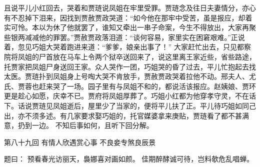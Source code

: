 \documentclass[12pt,oneside]{book}
\begin{document}
且说平儿小红回去，哭着和贾琏说凤姐在牢里受罪。贾琏念及往日夫妻情分，亦心有不忍掉下泪来，因找到贾赦贾政哭道：“如今他在那牢中受苦，虽是报应，却着实可怜。本以为休了他就罢了，谁知又牵出一串子命案，今生不得放出，大家再聚些银两减减他的罪罢。”贾赦贾政落泪道：“谈何容易，家里实在困窘艰难。”正说着，忽见巧姐大哭着跑进来道：“爹爹，娘亲出事了！”
大家赶忙出去，只见都察院将凤姐的尸首放在马车上令两个狱卒送回来了，说这里离王家近些，省些路途，托贾家把凤姐尸身送回王家。众人哭作一团，巧姐哭的昏了过去，平儿忙抱起去找太医。贾琏扑到凤姐身上号啕大哭不肯放手，贾赦贾政哭着拉他不动。邢夫人、尤氏、贾蓉也赶来哭了一场。园子里有与凤姐不和的，都说活该报应。赵姨娘、贾环更是趁心如愿，庆幸不已。贾府将凤姐厚葬了。巧姐小红都为他穿孝守灵，不在话下。话说贾琏见凤姐逝后，屋里少了当家的，便将平儿扶了正。平儿待巧姐如同己出，亦不须多述。有几家要求娶巧姐的，托官媒婆拿来庚贴，贾琏看了都不甚满意，扔到一边。
不知后事如何，且听下回分解。
 
 
第八十九回 有情人欣遇赏心事 不良妾专煞良辰景

题曰：
预看春光访丽天，裊娜喜对画如颜。
佳期醉酵诚可待，岂料欹危乱唱蝉。
\end{document}
